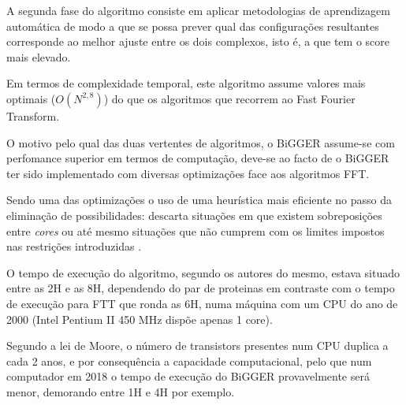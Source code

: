 A segunda fase do algoritmo consiste em aplicar metodologias de aprendizagem automática de modo a que se possa prever qual das configurações resultantes corresponde ao melhor ajuste entre os dois complexos, isto é, a que tem o score mais elevado.
 
Em termos de complexidade temporal, este algoritmo assume valores mais optimais ($O(N^{2,8})$) do que os algoritmos que recorrem ao Fast Fourier Transform. 

O motivo pelo qual das duas vertentes de algoritmos, o BiGGER assume-se com perfomance superior em termos de computação, deve-se ao facto de o BiGGER ter sido implementado com diversas optimizações face aos algoritmos FFT. 

Sendo uma das optimizações o uso de uma heurística mais eficiente no passo da eliminação de possibilidades: descarta situações em que existem sobreposições entre \textit{cores} ou até mesmo situações que não cumprem com os limites impostos nas restrições introduzidas . 

O tempo de execução do algoritmo, segundo os autores do mesmo, estava situado entre as 2H e as 8H, dependendo do par de proteinas em contraste com o tempo de execução para FTT que ronda as 6H, numa máquina com um CPU do ano de 2000 (Intel Pentium II 450 MHz dispõe apenas 1 core). 

Segundo a lei de Moore, o número de transistors presentes num CPU duplica a cada 2 anos, e por consequência a capacidade computacional, pelo que num computador em 2018 o tempo de execução do BiGGER provavelmente será menor, demorando entre 1H e 4H por exemplo.
